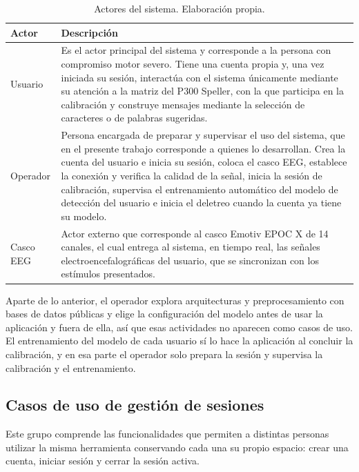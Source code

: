 \begin{table}[H]
\centering
\small
\begin{tabularx}{\textwidth}{|L{3.0cm}|Y|}
\hline
\textbf{Actor} & \textbf{Descripción} \\
\hline
Usuario & Es el actor principal del sistema y corresponde a la persona con compromiso motor severo. Tiene una cuenta propia y, una vez iniciada su sesión, interactúa con el sistema únicamente mediante su atención a la matriz del P300 Speller, con la que participa en la calibración y construye mensajes mediante la selección de caracteres o de palabras sugeridas. \\
\hline
Operador & Persona encargada de preparar y supervisar el uso del sistema, que en el presente trabajo corresponde a quienes lo desarrollan. Crea la cuenta del usuario e inicia su sesión, coloca el casco EEG, establece la conexión y verifica la calidad de la señal, inicia la sesión de calibración, supervisa el entrenamiento automático del modelo de detección del usuario e inicia el deletreo cuando la cuenta ya tiene su modelo. \\
\hline
Casco EEG & Actor externo que corresponde al casco Emotiv EPOC X de 14 canales, el cual entrega al sistema, en tiempo real, las señales electroencefalográficas del usuario, que se sincronizan con los estímulos presentados. \\
\hline
\end{tabularx}
\caption{Actores del sistema. Elaboración propia.}
\label{tab:actores}
\end{table}

Aparte de lo anterior, el operador explora arquitecturas y preprocesamiento con bases de datos
públicas y elige la configuración del modelo antes de usar la aplicación y fuera de ella, así que
esas actividades no aparecen como casos de uso. El entrenamiento del modelo de cada usuario sí lo
hace la aplicación al concluir la calibración, y en esa parte el operador solo prepara la sesión y
supervisa la calibración y el entrenamiento.

\subsection{Casos de uso de gestión de sesiones}

Este grupo comprende las funcionalidades que permiten a distintas personas utilizar la misma
herramienta conservando cada una su propio espacio: crear una cuenta, iniciar sesión y cerrar la sesión activa.


